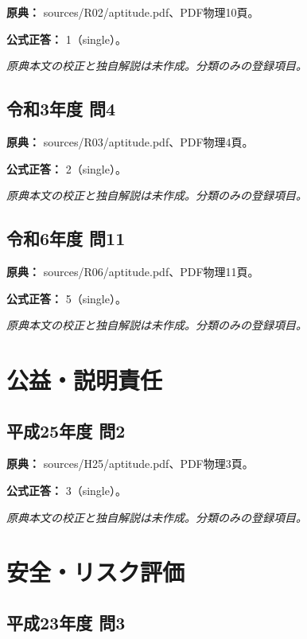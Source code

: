 \noindent\textbf{原典：} sources/R02/aptitude.pdf、PDF物理10頁。

\textbf{公式正答：} 1（single）。

\par\textit{原典本文の校正と独自解説は未作成。分類のみの登録項目。}

\subsection{令和3年度 問4}
\label{q:r03-reg-apt-04}

\noindent\textbf{原典：} sources/R03/aptitude.pdf、PDF物理4頁。

\textbf{公式正答：} 2（single）。

\par\textit{原典本文の校正と独自解説は未作成。分類のみの登録項目。}

\subsection{令和6年度 問11}
\label{q:r06-reg-apt-11}

\noindent\textbf{原典：} sources/R06/aptitude.pdf、PDF物理11頁。

\textbf{公式正答：} 5（single）。

\par\textit{原典本文の校正と独自解説は未作成。分類のみの登録項目。}

\section{公益・説明責任}

\subsection{平成25年度 問2}
\label{q:h25-reg-apt-02}

\noindent\textbf{原典：} sources/H25/aptitude.pdf、PDF物理3頁。

\textbf{公式正答：} 3（single）。

\par\textit{原典本文の校正と独自解説は未作成。分類のみの登録項目。}

\section{安全・リスク評価}

\subsection{平成23年度 問3}
\label{q:h23-reg-apt-03}

